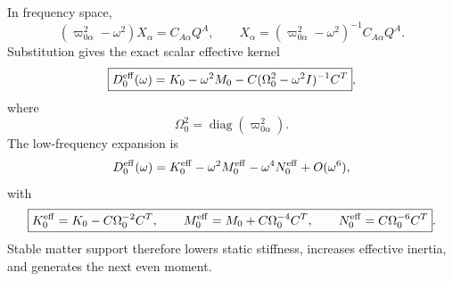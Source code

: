 In frequency space,
\begin{equation}
(\varpi_{0\alpha}^2-\omega^2)X_\alpha=C_{A\alpha}Q^A,
\qquad
X_\alpha=(\varpi_{0\alpha}^2-\omega^2)^{-1}C_{A\alpha}Q^A.
\end{equation}
Substitution gives the exact scalar effective kernel
\begin{equation}
\label{eq:app-stage003-scalar-kernel}
\boxed{
D_0^{\rm eff}(\omega)
=K_0-\omega^2M_0-C(\Omega_0^2-
\omega^2I)^{-1}C^T},
\end{equation}
where
\begin{equation}
\Omega_0^2=\operatorname{diag}(\varpi_{0\alpha}^2).
\end{equation}
The low-frequency expansion is
\begin{equation}
\label{eq:app-stage003-scalar-expansion}
D_0^{\rm eff}(\omega)
=K_0^{\rm eff}-\omega^2M_0^{\rm eff}-\omega^4N_0^{\rm eff}+O(\omega^6),
\end{equation}
with
\begin{equation}
\label{eq:app-stage003-keff}
\boxed{
K_0^{\rm eff}=K_0-C\Omega_0^{-2}C^T,
\qquad
M_0^{\rm eff}=M_0+C\Omega_0^{-4}C^T,
\qquad
N_0^{\rm eff}=C\Omega_0^{-6}C^T}.
\end{equation}
Stable matter support therefore lowers static stiffness, increases effective inertia, and generates the next even moment.


